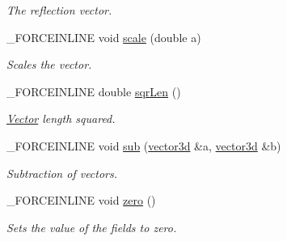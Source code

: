 \begin{DoxyCompactItemize}
\begin{DoxyCompactList}\small\item\em The reflection vector. \end{DoxyCompactList}\item 
\hypertarget{classbt_1_1vector3d_ae30c6189bd04f1dd5dd32af619cf1fbf}{\-\_\-\-F\-O\-R\-C\-E\-I\-N\-L\-I\-N\-E void \hyperlink{classbt_1_1vector3d_ae30c6189bd04f1dd5dd32af619cf1fbf}{scale} (double a)}\label{classbt_1_1vector3d_ae30c6189bd04f1dd5dd32af619cf1fbf}

\begin{DoxyCompactList}\small\item\em Scales the vector. \end{DoxyCompactList}\item 
\hypertarget{classbt_1_1vector3d_ab75abc02de2fa6cc2f09e036c2d2ade2}{\-\_\-\-F\-O\-R\-C\-E\-I\-N\-L\-I\-N\-E double \hyperlink{classbt_1_1vector3d_ab75abc02de2fa6cc2f09e036c2d2ade2}{sqr\-Len} ()}\label{classbt_1_1vector3d_ab75abc02de2fa6cc2f09e036c2d2ade2}

\begin{DoxyCompactList}\small\item\em \hyperlink{classbt_1_1_vector}{Vector} length squared. \end{DoxyCompactList}\item 
\hypertarget{classbt_1_1vector3d_ab43a473f052ce5e070616ec14380495a}{\-\_\-\-F\-O\-R\-C\-E\-I\-N\-L\-I\-N\-E void \hyperlink{classbt_1_1vector3d_ab43a473f052ce5e070616ec14380495a}{sub} (\hyperlink{classbt_1_1vector3d}{vector3d} \&a, \hyperlink{classbt_1_1vector3d}{vector3d} \&b)}\label{classbt_1_1vector3d_ab43a473f052ce5e070616ec14380495a}

\begin{DoxyCompactList}\small\item\em Subtraction of vectors. \end{DoxyCompactList}\item 
\hypertarget{classbt_1_1vector3d_af2804ef23e02d4069280513de148868e}{\-\_\-\-F\-O\-R\-C\-E\-I\-N\-L\-I\-N\-E void \hyperlink{classbt_1_1vector3d_af2804ef23e02d4069280513de148868e}{zero} ()}\label{classbt_1_1vector3d_af2804ef23e02d4069280513de148868e}

\begin{DoxyCompactList}\small\item\em Sets the value of the fields to zero. \end{DoxyCompactList}\end{DoxyCompactItemize}
